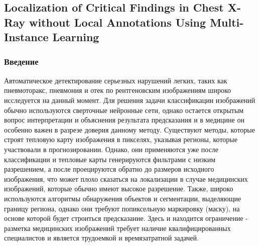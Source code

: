 \subsection*{Localization of Critical Findings in Chest X-Ray without Local Annotations Using Multi-Instance Learning}

\subsubsection*{Введение}
Автоматическое детектирование серьезных нарушений легких, таких как пневмоторакс, пневмония и отек по рентгеновским 
изображениям широко исследуется на данный момент. Для решения задачи классификации изображений обычно используются 
сверточные нейронные сети, однако остается открытым вопрос интерпретации и объяснения результата предсказания и в 
медицине он особенно важен в разрезе доверия данному методу. Существуют методы, которые строят тепловую карту изображения 
в пикселях, указывая регионы, которые участвовали в прогнозировании. Однако, они применяются уже после классификации и 
тепловые карты генерируются фильтрами с низким разрешением, а после проецируются обратно до размеров исходного изображения, 
что может плохо сказаться на локализации в случае медицинских изображений, которые обычно имеют высокое разрешение. 
Также, широко используются алгоритмы обнаружения объектов и сегментации, выделяющие границу региона, однако они требуют 
попиксельную маркировку (маску), на основе которой будет строиться предсказание. Здесь и находится ограничение - 
разметка медицинских изображений требует наличие квалифицированных специалистов и является трудоемкой и времязатратной задачей.
